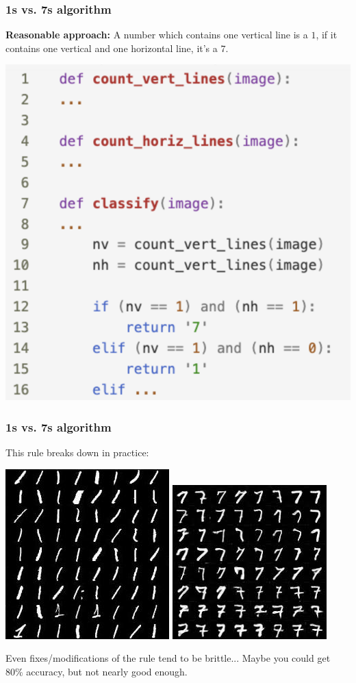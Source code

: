 \documentclass[handout,compress]{beamer}
\begin{document}
\begin{frame}
	\frametitle{1s vs. 7s  algorithm}
	\textbf{Reasonable approach:}
	A number which contains one vertical line is a $1$, if it contains one vertical and one horizontal line, it's a $7$.
	\begin{center}
		\includegraphics[width=.5\textwidth]{program.png}
	\end{center}
\end{frame}

\begin{frame}
	\frametitle{1s vs. 7s  algorithm}
	This rule breaks down in practice:
	\begin{center}
		\includegraphics[width=.4\textwidth]{ones.jpg}\hspace{1em} \includegraphics[width=.4\textwidth]{sevens.jpeg}
	\end{center}
	Even fixes/modifications of the rule tend to be brittle... Maybe you could get $80\%$ accuracy, but not nearly good enough.
\end{frame}
\end{document}
